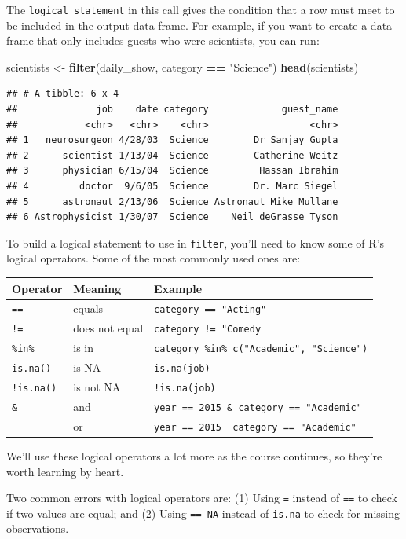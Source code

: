 \documentclass[]{book}
\makeatletter
\newenvironment{Shaded}{\begin{snugshade}}{\end{snugshade}}
\newcommand{\KeywordTok}[1]{\textcolor[rgb]{0.13,0.29,0.53}{\textbf{#1}}}
\newcommand{\StringTok}[1]{\textcolor[rgb]{0.31,0.60,0.02}{#1}}
\newcommand{\OperatorTok}[1]{\textcolor[rgb]{0.81,0.36,0.00}{\textbf{#1}}}
\newcommand{\NormalTok}[1]{#1}
\newenvironment{kframe}{%
\medskip{}
\setlength{\fboxsep}{.8em}
 \def\at@end@of@kframe{}%
 \ifinner\ifhmode%
  \def\at@end@of@kframe{\end{minipage}}%
  \begin{minipage}{\columnwidth}%
 \fi\fi%
 \def\FrameCommand##1{\hskip\@totalleftmargin \hskip-\fboxsep
 \colorbox{shadecolor}{##1}\hskip-\fboxsep
     \hskip-\linewidth \hskip-\@totalleftmargin \hskip\columnwidth}%
 \MakeFramed {\advance\hsize-\width
   \@totalleftmargin\z@ \linewidth\hsize
   \@setminipage}}%
 {\par\unskip\endMakeFramed%
 \at@end@of@kframe}
\renewenvironment{Shaded}{\begin{kframe}}{\end{kframe}}
\newenvironment{rmdblock}[1]
  {
  \begin{itemize}
  \renewcommand{\labelitemi}{
    \raisebox{-.7\height}[0pt][0pt]{
      {\setkeys{Gin}{width=3em,keepaspectratio}\texttt{[image: images/\#1]}}
    }
  }
  \setlength{\fboxsep}{1em}
  \begin{kframe}
  \item
  }
  {
  \end{kframe}
  \end{itemize}
  }
\newenvironment{rmdwarning}
  {\begin{rmdblock}{warning}}
  {\end{rmdblock}}
\theoremstyle{definition}
\theoremstyle{definition}
\theoremstyle{definition}
\theoremstyle{remark}
\makeatother
\begin{document}
The \texttt{logical\ statement} in this call gives the condition that a
row must meet to be included in the output data frame. For example, if
you want to create a data frame that only includes guests who were
scientists, you can run:

\begin{Shaded}
\begin{Highlighting}[]
\NormalTok{scientists <-}\StringTok{ }\KeywordTok{filter}\NormalTok{(daily_show, category }\OperatorTok{==}\StringTok{ "Science"}\NormalTok{)}
\KeywordTok{head}\NormalTok{(scientists)}
\end{Highlighting}
\end{Shaded}

\begin{verbatim}
## # A tibble: 6 x 4
##              job    date category             guest_name
##            <chr>   <chr>    <chr>                  <chr>
## 1   neurosurgeon 4/28/03  Science        Dr Sanjay Gupta
## 2      scientist 1/13/04  Science        Catherine Weitz
## 3      physician 6/15/04  Science         Hassan Ibrahim
## 4         doctor  9/6/05  Science        Dr. Marc Siegel
## 5      astronaut 2/13/06  Science Astronaut Mike Mullane
## 6 Astrophysicist 1/30/07  Science    Neil deGrasse Tyson
\end{verbatim}

To build a logical statement to use in \texttt{filter}, you'll need to
know some of R's logical operators. Some of the most commonly used ones
are:

\begin{longtable}[]{@{}lll@{}}
\toprule
Operator & Meaning & Example\tabularnewline
\midrule
\endhead
\texttt{==} & equals & \texttt{category\ ==\ "Acting"}\tabularnewline
\texttt{!=} & does not equal &
\texttt{category\ !=\ "Comedy}\tabularnewline
\texttt{\%in\%} & is in &
\texttt{category\ \%in\%\ c("Academic",\ "Science")}\tabularnewline
\texttt{is.na()} & is NA & \texttt{is.na(job)}\tabularnewline
\texttt{!is.na()} & is not NA & \texttt{!is.na(job)}\tabularnewline
\texttt{\&} & and &
\texttt{year\ ==\ 2015\ \&\ category\ ==\ "Academic"}\tabularnewline
\texttt{\textbar{}} & or &
\texttt{year\ ==\ 2015\ \textbar{}\ category\ ==\ "Academic"}\tabularnewline
\bottomrule
\end{longtable}

We'll use these logical operators a lot more as the course continues, so
they're worth learning by heart.

\begin{rmdwarning}
Two common errors with logical operators are: (1) Using \texttt{=}
instead of \texttt{==} to check if two values are equal; and (2) Using
\texttt{==\ NA} instead of \texttt{is.na} to check for missing
observations.
\end{rmdwarning}
\end{document}
